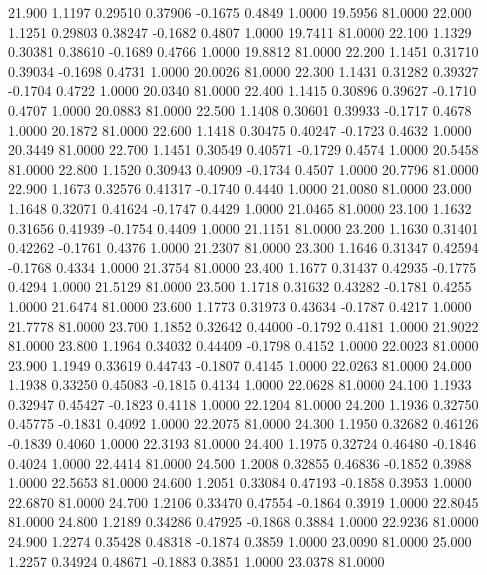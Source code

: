   21.900   1.1197   0.29510   0.37906  -0.1675   0.4849   1.0000  19.5956  81.0000
  22.000   1.1251   0.29803   0.38247  -0.1682   0.4807   1.0000  19.7411  81.0000
  22.100   1.1329   0.30381   0.38610  -0.1689   0.4766   1.0000  19.8812  81.0000
  22.200   1.1451   0.31710   0.39034  -0.1698   0.4731   1.0000  20.0026  81.0000
  22.300   1.1431   0.31282   0.39327  -0.1704   0.4722   1.0000  20.0340  81.0000
  22.400   1.1415   0.30896   0.39627  -0.1710   0.4707   1.0000  20.0883  81.0000
  22.500   1.1408   0.30601   0.39933  -0.1717   0.4678   1.0000  20.1872  81.0000
  22.600   1.1418   0.30475   0.40247  -0.1723   0.4632   1.0000  20.3449  81.0000
  22.700   1.1451   0.30549   0.40571  -0.1729   0.4574   1.0000  20.5458  81.0000
  22.800   1.1520   0.30943   0.40909  -0.1734   0.4507   1.0000  20.7796  81.0000
  22.900   1.1673   0.32576   0.41317  -0.1740   0.4440   1.0000  21.0080  81.0000
  23.000   1.1648   0.32071   0.41624  -0.1747   0.4429   1.0000  21.0465  81.0000
  23.100   1.1632   0.31656   0.41939  -0.1754   0.4409   1.0000  21.1151  81.0000
  23.200   1.1630   0.31401   0.42262  -0.1761   0.4376   1.0000  21.2307  81.0000
  23.300   1.1646   0.31347   0.42594  -0.1768   0.4334   1.0000  21.3754  81.0000
  23.400   1.1677   0.31437   0.42935  -0.1775   0.4294   1.0000  21.5129  81.0000
  23.500   1.1718   0.31632   0.43282  -0.1781   0.4255   1.0000  21.6474  81.0000
  23.600   1.1773   0.31973   0.43634  -0.1787   0.4217   1.0000  21.7778  81.0000
  23.700   1.1852   0.32642   0.44000  -0.1792   0.4181   1.0000  21.9022  81.0000
  23.800   1.1964   0.34032   0.44409  -0.1798   0.4152   1.0000  22.0023  81.0000
  23.900   1.1949   0.33619   0.44743  -0.1807   0.4145   1.0000  22.0263  81.0000
  24.000   1.1938   0.33250   0.45083  -0.1815   0.4134   1.0000  22.0628  81.0000
  24.100   1.1933   0.32947   0.45427  -0.1823   0.4118   1.0000  22.1204  81.0000
  24.200   1.1936   0.32750   0.45775  -0.1831   0.4092   1.0000  22.2075  81.0000
  24.300   1.1950   0.32682   0.46126  -0.1839   0.4060   1.0000  22.3193  81.0000
  24.400   1.1975   0.32724   0.46480  -0.1846   0.4024   1.0000  22.4414  81.0000
  24.500   1.2008   0.32855   0.46836  -0.1852   0.3988   1.0000  22.5653  81.0000
  24.600   1.2051   0.33084   0.47193  -0.1858   0.3953   1.0000  22.6870  81.0000
  24.700   1.2106   0.33470   0.47554  -0.1864   0.3919   1.0000  22.8045  81.0000
  24.800   1.2189   0.34286   0.47925  -0.1868   0.3884   1.0000  22.9236  81.0000
  24.900   1.2274   0.35428   0.48318  -0.1874   0.3859   1.0000  23.0090  81.0000
  25.000   1.2257   0.34924   0.48671  -0.1883   0.3851   1.0000  23.0378  81.0000
